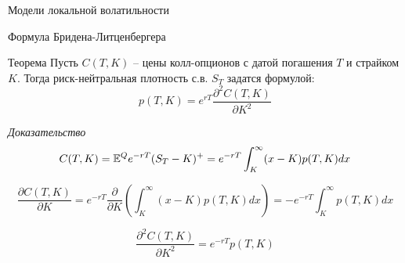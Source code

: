 \documentclass[aspectratio=169]{beamer}
\begin{document}
\begin{frame}{Модели локальной волатильности}
    \begin{itemize}
        
    \end{itemize}
\end{frame}

\begin{frame}{Формула Бридена-Литценбергера}
    \begin{block}{Теорема}
        Пусть $C(T, K)$ -- цены колл-опционов с датой погашения $T$ и страйком $K$. Тогда риск-нейтральная плотность с.в. $S_T$ задатся формулой:
        $$
            p(T, K) = e^{rT} \dfrac{\partial^2 C(T, K)}{\partial K^2 } 
        $$
    \end{block}
    \textit{Доказательство}
    $$
        C(T, K) = \mathbb{E}^Q e^{-rT} (S_T - K)^+ = 
        e^{-rT} \int_{K}^{\infty}(x-K) p(T, K) dx
    $$
    
    $$
        \dfrac{\partial C(T, K)}{\partial K }
        = e^{-rT} \dfrac{\partial}{\partial K} \left( \int_{K}^{\infty}(x-K) p(T, K) dx \right)
        = -e^{-rT} \int_{K}^{\infty}p(T, K) dx
    $$

    $$
    \dfrac{\partial^2 C(T, K)}{\partial K^2 }
    = e^{-rT} p(T, K)
    $$
\end{frame}
\end{document}
